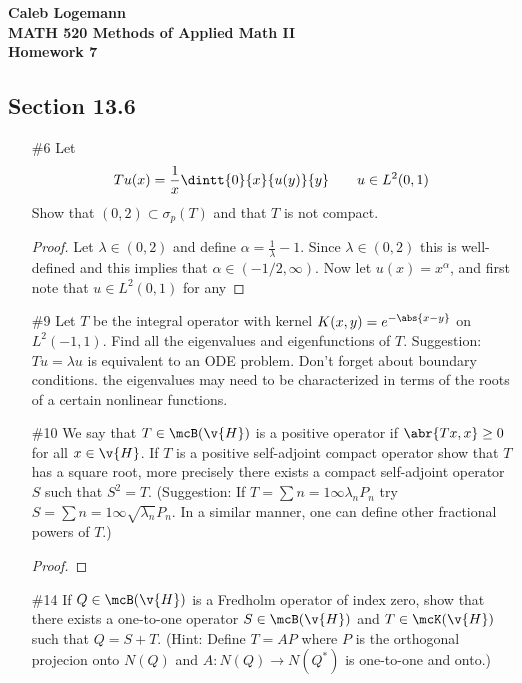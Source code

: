\documentclass[11pt, oneside]{article}
\begin{document}
\noindent \textbf{\Large{Caleb Logemann \\
MATH 520 Methods of Applied Math II \\
Homework 7
}}

\subsection*{Section 13.6}
\begin{enumerate}
  \item[\#6]
    Let
    \[
      Tu(x) = \frac{1}{x} \dintt{0}{x}{u(y)}{y} \qquad u \in L^2(0, 1)
    \]
    Show that $(0, 2) \subset \sigma_p(T)$ and that $T$ is not compact.

    \begin{proof}
      Let $\lambda \in (0, 2)$ and define $\alpha = \frac{1}{\lambda} - 1$.
      Since $\lambda \in (0, 2)$ this is well-defined and this implies that
      $\alpha \in (-1/2, \infty)$.
      Now let $u(x) = x^{\alpha}$, and first note that $u \in L^2(0, 1)$ for
      any 
    \end{proof}

  \item[\#9]
    Let $T$ be the integral operator with kernel $K(x, y) = e^{-\abs{x - y}}$
    on $L^2(-1, 1)$.
    Find all the eigenvalues and eigenfunctions of $T$.
    Suggestion: $Tu = \lambda u$ is equivalent to an ODE problem.
    Don't forget about boundary conditions.
    the eigenvalues may need to be characterized in terms of the roots of a
    certain nonlinear functions.

  \item[\#10]
    We say that $T \in \mcB(\v{H})$ is a positive operator if
    $\abr{Tx, x} \ge 0$ for all $x \in \v{H}$.
    If $T$ is a positive self-adjoint compact operator show that $T$ has a
    square root, more precisely there exists a compact self-adjoint operator $S$
    such that $S^2 = T$.
    (Suggestion: If $T = \sum{n = 1}{\infty}{\lambda_n P_n}$ try
    $S = \sum{n = 1}{\infty}{\sqrt{\lambda_n} P_n}$.
    In a similar manner, one can define other fractional powers of $T$.)

    \begin{proof}
      
    \end{proof}

  \item[\#14] %
    If $Q \in \mcB(\v{H})$ is a Fredholm operator of index zero, show that there
    exists a one-to-one operator $S \in \mcB(\v{H})$ and $T \in \mcK(\v{H})$
    such that $Q = S + T$.
    (Hint: Define $T = AP$ where $P$ is the orthogonal projecion onto $N(Q)$ and
    $A: N(Q) \to N(Q^*)$ is one-to-one and onto.)


\end{enumerate}
\end{document}
